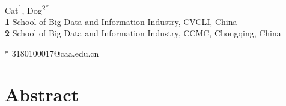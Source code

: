 \documentclass[10pt,letterpaper]{article}
\begin{document}
\vspace*{0.2in}

\begin{flushleft}
{\Large
\textbf{} %
}
\\
Cat\textsuperscript{1},
Dog\textsuperscript{2*}
\\
\bigskip
\textbf{1} School of Big Data and Information Industry, CVCLI, China
\\
\textbf{2} School of Big Data and Information Industry, CCMC, Chongqing, China
\\
\bigskip

% 
%





* 3180100017@caa.edu.cn

\end{flushleft}
\section*{Abstract}
\end{document}
